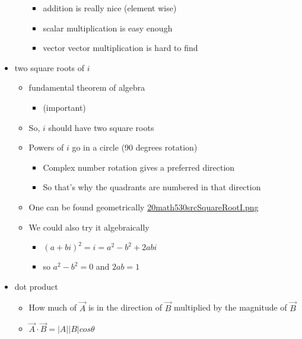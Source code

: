 \documentclass[letterpaper]{article}
\begin{document}
\begin{itemize}
\begin{itemize}
\begin{itemize}
\item addition is really nice (element wise)
\item scalar multiplication is easy enough
\item vector vector multiplication is hard to find
\end{itemize}
\end{itemize}

\item two square roots of \(i\)

\begin{itemize}
\item fundamental theorem of algebra

\begin{itemize}
\item (important)
\end{itemize}

\item So, \(i\) should have two square roots
\item Powers of \(i\) go in a circle (90 degrees rotation)

\begin{itemize}
\item Complex number rotation gives a preferred direction
\item So that's why the quadrants are numbered in that direction
\end{itemize}

\item One can be found geometrically
\href{20math530srcSquareRootI.png.org}{20math530srcSquareRootI.png}
\item We could also try it algebraically

\begin{itemize}
\item \((a+bi)^2=i=a^2-b^2+2abi\)
\item so \(a^2-b^2 = 0\) and \(2ab = 1\)
\end{itemize}
\end{itemize}

\item dot product

\begin{itemize}
\item How much of \(\vec{A}\) is in the direction of \(\vec{B}\)
multiplied by the magnitude of \(\vec{B}\)
\item \(\vec{A} \cdot \vec{B} = |A||B| cos \theta\)


\end{itemize}
\end{itemize}
\end{document}
